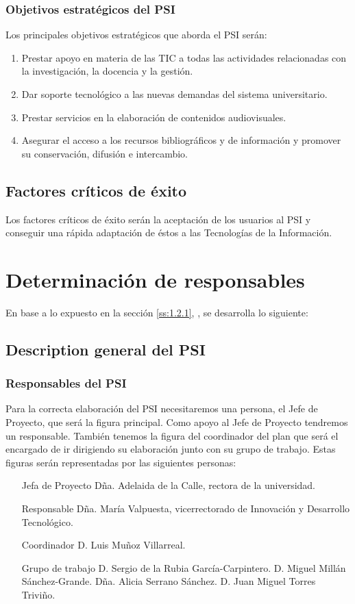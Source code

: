 \documentclass[11pt,a4paper,spanish,twoside]{book}
\begin{document}
\subsubsection{Objetivos estratégicos del PSI}
Los principales objetivos estratégicos que aborda el PSI serán:
\begin{enumerate}
\item Prestar apoyo en materia de las TIC a todas las actividades relacionadas
con la investigación, la docencia y la gestión.
\item Dar soporte tecnológico a las nuevas demandas del sistema universitario.
\item Prestar servicios en la elaboración de contenidos audiovisuales.
\item Asegurar el acceso a los recursos bibliográficos y de información y 
promover su conservación, difusión e intercambio.
\end{enumerate}

\subsection{Factores críticos de éxito}
Los factores críticos de éxito serán la aceptación de
los usuarios al PSI y conseguir una rápida adaptación de éstos a las
Tecnologías de la Información.

\section{Determinación de responsables}
En base a lo expuesto en la sección \vref{ss:1.2.1}, \emph{},
se desarrolla lo siguiente:

\subsection{Description general del PSI}\label{ss:1.3.1}
\subsubsection{Responsables del PSI}
Para la correcta elaboración del PSI necesitaremos una persona, el Jefe de 
Proyecto, que será la figura principal. Como apoyo al Jefe de Proyecto 
tendremos un responsable. También tenemos la figura del coordinador del plan 
que será el encargado de ir dirigiendo su elaboración junto con su grupo de 
trabajo. Estas figuras serán representadas por las siguientes personas:
\begin{itemize}
\item[Jefa de Proyecto]
Dña. Adelaida de la Calle, rectora de la universidad.
\item[Responsable]
Dña. María Valpuesta, vicerrectorado de Innovación y Desarrollo Tecnológico.
\item[Coordinador]
D. Luis Muñoz Villarreal.
\item[Grupo de trabajo]
D. Sergio de la Rubia García-Carpintero.
D. Miguel Millán Sánchez-Grande.
Dña. Alicia Serrano Sánchez.
D. Juan Miguel Torres Triviño.
\end{itemize}
\end{document}
